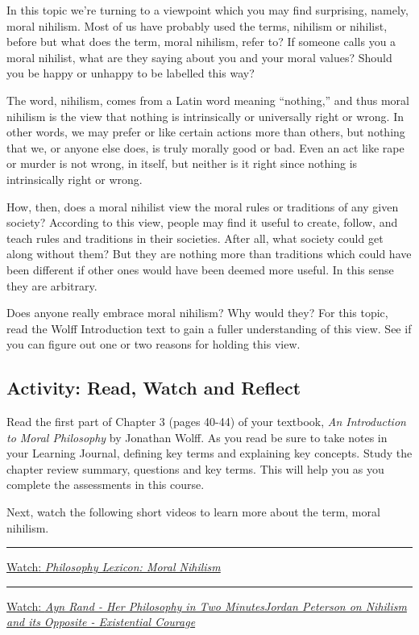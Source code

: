 \documentclass[
]{book}
\begin{document}
In this topic we're turning to a viewpoint which you may find surprising, namely, moral nihilism. Most of us have probably used the terms, nihilism or nihilist, before but what does the term, moral nihilism, refer to? If someone calls you a moral nihilist, what are they saying about you and your moral values? Should you be happy or unhappy to be labelled this way?

The word, nihilism, comes from a Latin word meaning ``nothing,'' and thus moral nihilism is the view that nothing is intrinsically or universally right or wrong. In other words, we may prefer or like certain actions more than others, but nothing that we, or anyone else does, is truly morally good or bad. Even an act like rape or murder is not wrong, in itself, but neither is it right since nothing is intrinsically right or wrong.

How, then, does a moral nihilist view the moral rules or traditions of any given society? According to this view, people may find it useful to create, follow, and teach rules and traditions in their societies. After all, what society could get along without them? But they are nothing more than traditions which could have been different if other ones would have been deemed more useful. In this sense they are arbitrary.

Does anyone really embrace moral nihilism? Why would they? For this topic, read the Wolff Introduction text to gain a fuller understanding of this view. See if you can figure out one or two reasons for holding this view.

\hypertarget{activity-read-watch-and-reflect-1}{%
\subsection*{Activity: Read, Watch and Reflect}\label{activity-read-watch-and-reflect-1}}

\begin{reflect}
Read the first part of Chapter 3 (pages 40-44) of your textbook, \emph{An Introduction to Moral Philosophy} by Jonathan Wolff. As you read be sure to take notes in your Learning Journal, defining key terms and explaining key concepts. Study the chapter review summary, questions and key terms. This will help you as you complete the assessments in this course.

Next, watch the following short videos to learn more about the term, moral nihilism.

\begin{center}\rule{0.5\linewidth}{0.5pt}\end{center}

\href{https://www.youtube.com/watch?v=7VwpSMgJYqA}{Watch: \emph{Philosophy Lexicon: Moral Nihilism}}

\begin{center}\rule{0.5\linewidth}{0.5pt}\end{center}

\href{https://www.youtube.com/watch?v=R-sYDf0YGv4}{Watch: \emph{Ayn Rand - Her Philosophy in Two MinutesJordan Peterson on Nihilism and its Opposite - Existential Courage}}
\end{reflect}
\end{document}

